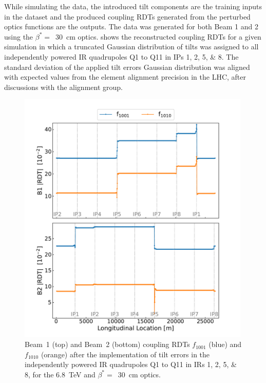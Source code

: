 While simulating the data, the introduced tilt components are the training inputs in the dataset and the produced coupling RDTs generated from the perturbed optics functions are the outputs.
The data was generated for both Beam 1 and 2 using the \(\beta^{\ast}=\)~\qty{30}{\centi\meter} optics.
 shows the reconstructed coupling RDTs for a given simulation in which a truncated Gaussian distribution of tilts was assigned to all independently powered IR quadrupoles Q\num{1} to Q\num{11} in IPs \numlist{1;2;5;8}.
The standard deviation of the applied tilt errors Gaussian distribution was aligned with expected values from the element alignment precision in the LHC, after discussions with the alignment group.

\begin{figure}[!htb]
    \centering
    \includegraphics*[width=0.99\textwidth]{Figures/ML_for_IR_Coupling/ml_local_sources_rdts_combined.pdf}
    \caption{Beam~\num{1} (top) and Beam~\num{2} (bottom) coupling RDTs \(f_{1001}\) (\textcolor{mplblue}{blue}) and \(f_{1010}\) (\textcolor{mplorange}{orange}) after the implementation of tilt errors in the independently powered IR quadrupoles Q\num{1} to Q\num{11} in IRs \numlist{1;2;5;8}, for the \qty{6.8}{\tera\electronvolt} and \(\beta^{\ast}=\)~\qty{30}{\centi\meter} optics.}
    \label{figure:ml_local_sources_rdts}
\end{figure}

